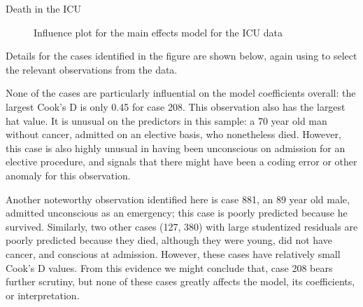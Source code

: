 \documentclass[11pt]{book}
\renewenvironment{knitrout}{\small\renewcommand{\baselinestretch}{.85}}{} %
\begin{document}
\begin{Example}[icu2]{Death in the ICU}
\begin{knitrout}
\begin{figure}[!htbp]
\caption[Influence plot for the main effects model for the ICU data]{Influence plot for the main effects model for the ICU data\label{fig:icu2-inflplot}}
\end{figure}


\end{knitrout}

Details for the cases identified in the figure are shown below, again using
 to select the relevant observations from the 
data.

\begin{knitrout}
\color{fgcolor}
\end{knitrout}
None of the cases are particularly influential on the model coefficients overall:
the largest Cook's D is only 0.45 for case 208.
This observation also has 
the largest hat value. It is unusual on the predictors
in this sample: a 70 year old man without cancer, admitted on an elective
basis, who nonetheless died. However, this case is also highly unusual 
in having been unconscious on admission for an elective procedure, and
signals that there might have been a coding error or other anomaly
for this observation.

Another noteworthy observation identified here is 
case 881, an 89 year old male, admitted unconscious
as an emergency; this case is poorly predicted because he survived.
Similarly, two other cases (127, 380) with large studentized residuals
are poorly predicted because they died, although they were
young, did not have cancer, and conscious at admission.
However, these cases have relatively small Cook's D values.
From this evidence we might conclude that, case 208 bears further scrutiny,
but none of these cases greatly affects the model, 
its coefficients, or interpretation.


\end{Example}
\end{document}
